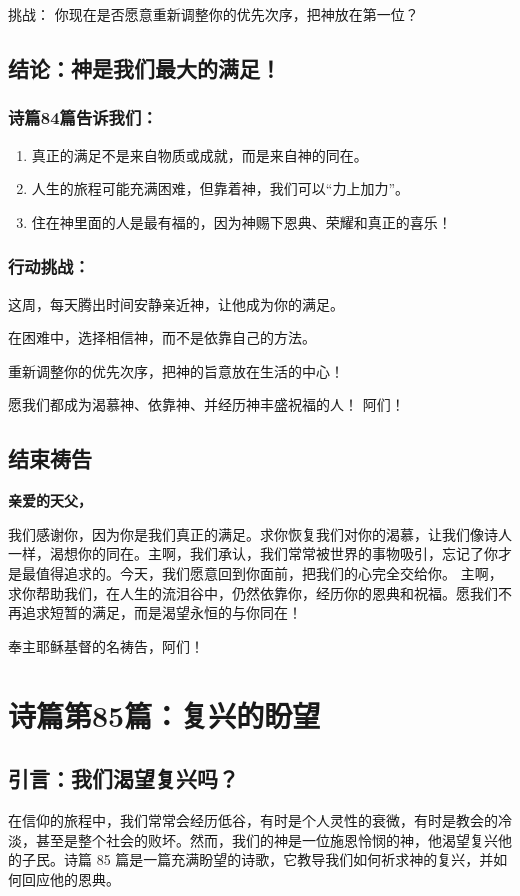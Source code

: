 \documentclass[a4paper, 12pt]{article}
\begin{document}
挑战： 你现在是否愿意重新调整你的优先次序，把神放在第一位？
\subsection*{结论：神是我们最大的满足！}
\subsubsection*{诗篇84篇告诉我们：}
\begin{enumerate}
    \item 真正的满足不是来自物质或成就，而是来自神的同在。

    \item 人生的旅程可能充满困难，但靠着神，我们可以“力上加力”。

    \item 住在神里面的人是最有福的，因为神赐下恩典、荣耀和真正的喜乐！

    
\end{enumerate}
\subsubsection*{行动挑战：}

\hspace{0.6cm}这周，每天腾出时间安静亲近神，让他成为你的满足。

在困难中，选择相信神，而不是依靠自己的方法。

重新调整你的优先次序，把神的旨意放在生活的中心！

愿我们都成为渴慕神、依靠神、并经历神丰盛祝福的人！ 阿们！
\subsection*{结束祷告}
\textbf{亲爱的天父，}

我们感谢你，因为你是我们真正的满足。求你恢复我们对你的渴慕，让我们像诗人一样，渴想你的同在。主啊，我们承认，我们常常被世界的事物吸引，忘记了你才是最值得追求的。今天，我们愿意回到你面前，把我们的心完全交给你。
主啊，求你帮助我们，在人生的流泪谷中，仍然依靠你，经历你的恩典和祝福。愿我们不再追求短暂的满足，而是渴望永恒的与你同在！

奉主耶稣基督的名祷告，阿们！
\newpage
\section{诗篇第85篇：复兴的盼望}
\subsection*{引言：我们渴望复兴吗？}
在信仰的旅程中，我们常常会经历低谷，有时是个人灵性的衰微，有时是教会的冷淡，甚至是整个社会的败坏。然而，我们的神是一位施恩怜悯的神，他渴望复兴他的子民。诗篇 85 篇是一篇充满盼望的诗歌，它教导我们如何祈求神的复兴，并如何回应他的恩典。
\end{document}
